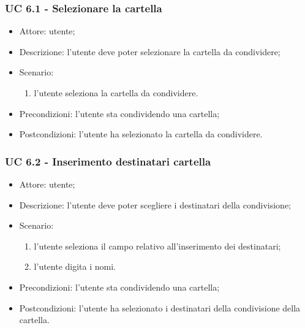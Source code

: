     \subsubsection{UC 6.1 - Selezionare la cartella} \label{sec: UC 6.1}
    \begin{itemize}
        \item Attore: utente;
        \item Descrizione: l'utente deve poter selezionare la cartella da condividere;
        \item Scenario:
        \begin{enumerate}
        \item l'utente seleziona la cartella da condividere.
        \end{enumerate}
        \item Precondizioni: l'utente sta condividendo una cartella;
        \item Postcondizioni: l'utente ha selezionato la cartella da condividere.
    \end{itemize}
    \subsubsection{UC 6.2 - Inserimento destinatari cartella} \label{sec: UC 6.2}
    \begin{itemize}
        \item Attore: utente;
        \item Descrizione: l'utente deve poter scegliere i destinatari della condivisione;
        \item Scenario:
        \begin{enumerate}
        \item l'utente seleziona il campo relativo all'inserimento dei destinatari;
        \item l'utente digita i nomi.
        \end{enumerate}
        \item Precondizioni: l'utente sta condividendo una cartella;
        \item Postcondizioni: l'utente ha selezionato i destinatari della condivisione della cartella.
    \end{itemize}
    
